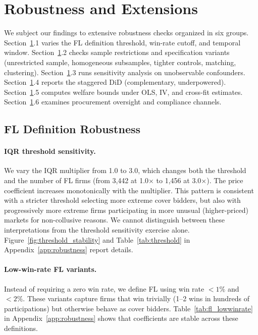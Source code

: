 \section{Robustness and Extensions}
\label{sec:robustness}

We subject our findings to extensive robustness checks organized in six
groups. Section~\ref{sec:robustness}.1 varies the FL definition
threshold, win-rate cutoff, and temporal window.
Section~\ref{sec:robustness}.2 checks sample restrictions and
specification variants (unrestricted sample, homogeneous subsamples,
tighter controls, matching, clustering).
Section~\ref{sec:robustness}.3 runs sensitivity analysis on unobservable
confounders. Section~\ref{sec:robustness}.4 reports the staggered DiD
(complementary, underpowered). Section~\ref{sec:robustness}.5 computes
welfare bounds under OLS, IV, and cross-fit estimates.
Section~\ref{sec:robustness}.6 examines procurement oversight and
compliance channels.

\subsection{FL Definition Robustness}

\paragraph{IQR threshold sensitivity.}
We vary the IQR multiplier from 1.0 to 3.0, which changes both the
threshold and the number of FL firms (from 3,442 at 1.0$\times$ to 1,456
at 3.0$\times$). The price coefficient increases monotonically with the %
multiplier. This pattern is consistent with a stricter threshold
selecting more extreme cover bidders, but also with progressively more
extreme firms participating in more unusual (higher-priced) markets for
non-collusive reasons. We cannot distinguish between these
interpretations from the threshold sensitivity exercise alone.
Figure~\ref{fig:threshold_stability} and Table~\ref{tab:threshold} in
Appendix~\ref{app:robustness} report details.

\paragraph{Low-win-rate FL variants.}
Instead of requiring a zero win rate, we define FL using win rate
$< 1\%$ and $< 2\%$. These variants capture firms that win trivially
(1--2 wins in hundreds of participations) but otherwise behave as cover
bidders. Table~\ref{tab:fl_lowwinrate} in Appendix~\ref{app:robustness}
shows that coefficients are stable across these definitions.

